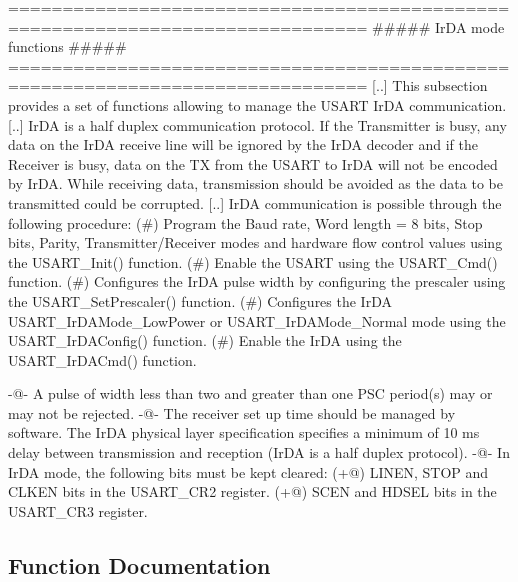 \begin{DoxyVerb} ===============================================================================
                        ##### IrDA mode functions #####
 ===============================================================================  
    [..]
    This subsection provides a set of functions allowing to manage the USART 
    IrDA communication.
    [..]
    IrDA is a half duplex communication protocol. If the Transmitter is busy, any data
    on the IrDA receive line will be ignored by the IrDA decoder and if the Receiver 
    is busy, data on the TX from the USART to IrDA will not be encoded by IrDA.
    While receiving data, transmission should be avoided as the data to be transmitted
    could be corrupted.
    [..]
    IrDA communication is possible through the following procedure:
      (#) Program the Baud rate, Word length = 8 bits, Stop bits, Parity, Transmitter/Receiver 
          modes and hardware flow control values using the USART_Init() function.
      (#) Enable the USART using the USART_Cmd() function.
      (#) Configures the IrDA pulse width by configuring the prescaler using  
          the USART_SetPrescaler() function.
      (#) Configures the IrDA  USART_IrDAMode_LowPower or USART_IrDAMode_Normal mode
          using the USART_IrDAConfig() function.
      (#) Enable the IrDA using the USART_IrDACmd() function.

      -@- A pulse of width less than two and greater than one PSC period(s) may or may
          not be rejected.
      -@- The receiver set up time should be managed by software. The IrDA physical layer
          specification specifies a minimum of 10 ms delay between transmission and 
          reception (IrDA is a half duplex protocol).
      -@- In IrDA mode, the following bits must be kept cleared:
        (+@) LINEN, STOP and CLKEN bits in the USART_CR2 register.
        (+@) SCEN and HDSEL bits in the USART_CR3 register.\end{DoxyVerb}
 

\subsection{Function Documentation}
\mbox{\label{group___u_s_a_r_t___group7_gabff56ebb494fdfadcc6ef4fe9ac8dd24}} 
